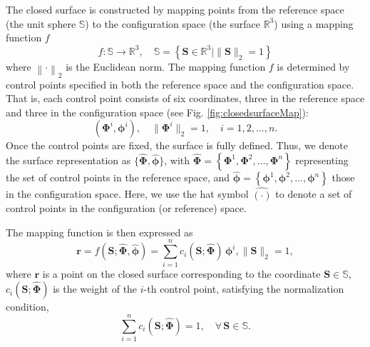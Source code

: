 \documentclass[journal]{IEEEtran}
\theoremstyle{definition}
\begin{document}
The closed surface is constructed by mapping points from the reference space (the unit sphere $\mathbb{S}$) to the configuration space (the surface $\mathbb{R}^{3}$) using a mapping function \(f\)
\begin{equation}
  f: \mathbb{S} \rightarrow \mathbb{R}^{3}, \quad \mathbb{S} = \left\{ \mathbf{S} \in \mathbb{R}^{3} \mid \|\mathbf{S}\|_2 = 1 \right\}
  \label{eq:sphere_mapping_function}
\end{equation}
where $\left\|\cdot\right\|_2$ is the Euclidean norm. The mapping function \(f\) is determined by control points specified in both the reference space and the configuration space. That is, each control point consists of six coordinates, three in the reference space and three in the configuration space (see Fig. \ref{fig:closedsurfaceMap}):
\begin{equation}
  \left( \mathbf{\Phi}^i, \boldsymbol{\phi}^i \right), \quad \|\mathbf{\Phi}^i\|_2 = 1,\quad i=1,2,\dots,n.
  \label{eq:closed_surface_control_point}
\end{equation}
Once the control points are fixed, the surface is fully defined. Thus, we denote the surface representation as $\{\hat{\mathbf{\Phi}}, \hat{\boldsymbol{\phi}}\}$, with $\hat{\mathbf{\Phi}} = \left\{\mathbf{\Phi}^1, \mathbf{\Phi}^2, \dots, \mathbf{\Phi}^n\right\}$ representing the set of control points in the reference space, and $\hat{\boldsymbol{\phi}} = \left\{\boldsymbol{\phi}^1, \boldsymbol{\phi}^2, \dots, \boldsymbol{\phi}^n\right\}$ those in the configuration space. Here, we use the hat symbol $\hat{\left(\cdot\right)}$ to denote a set of control points in the configuration (or reference) space. 

The mapping function is then expressed as
\begin{equation}
  \mathbf{r} = f(\mathbf{S}; \hat{\mathbf{\Phi}},\hat{\boldsymbol{\phi}}) = \sum_{i=1}^n c_i(\mathbf{S}; \hat{\mathbf{\Phi}})\,\boldsymbol{\phi}^i, \|\mathbf{S}\|_2=1,
  \label{eq:sphere_mapping}
\end{equation}
where \(\mathbf{r}\) is a point on the closed surface corresponding to the coordinate \(\mathbf{S} \in \mathbb{S}\), \(c_i(\mathbf{S}; \hat{\mathbf{\Phi}})\) is the weight of the $i$-th control point, satisfying the normalization condition,
\begin{equation}
  \sum_{i=1}^n c_i(\mathbf{S}; \hat{\mathbf{\Phi}}) = 1, \quad \forall\, \mathbf{S} \in \mathbb{S}.
  \label{eq:weight_sum}
\end{equation}
\end{document}
